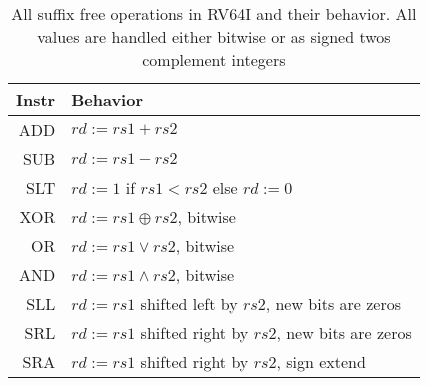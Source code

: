 \begin{table}
    \centering
    \begin{tabular}{>{\ttfamily}r|l}
        \hline
        Instr & Behavior                                               \\
        \hline
        ADD   & $rd := rs1 + rs2$                                      \\
        SUB   & $rd := rs1 - rs2$                                      \\
        SLT   & $rd := 1$ if $rs1 < rs2$ else $rd := 0$                \\
        XOR   & $rd := rs1 \oplus rs2$, bitwise                        \\
        OR    & $rd := rs1 \vee rs2$, bitwise                          \\
        AND   & $rd := rs1 \wedge rs2$, bitwise                        \\
        SLL   & $rd := rs1$ shifted left by $rs2$, new bits are zeros  \\
        SRL   & $rd := rs1$ shifted right by $rs2$, new bits are zeros \\
        SRA   & $rd := rs1$ shifted right by $rs2$, sign extend        \\
    \end{tabular}
    \caption[Behavior of RV64I operations]{All suffix free
        operations in RV64I and their behavior. All values are handled either bitwise or as signed twos complement integers}\label{tab:operations}
\end{table}